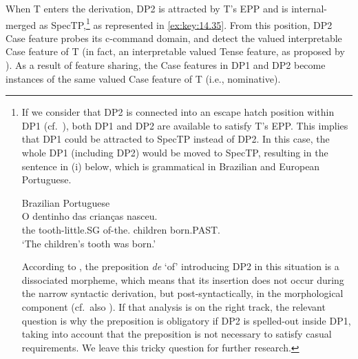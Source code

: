 \documentclass[output=paper]{langsci/langscibook}
\begin{document}
When T enters the derivation, DP2 is attracted by T’s \gls{EPP} and is
internal-merged as SpecTP,\footnote{If we consider that DP2 is connected into
    an escape hatch position within DP1 (cf.\ \citealt{Avelar2006}), both DP1
    and DP2 are available to satisfy T’s \gls{EPP}. This implies that DP1 could
    be attracted to SpecTP instead of DP2. In this case, the whole DP1
    (including DP2) would be moved to SpecTP, resulting in the sentence in (i)
    below, which is grammatical in Brazilian and European Portuguese.

    \begin{exe}
        Brazilian Portuguese\\
        \gll    O dentinho das   crianças nasceu.\\
                the tooth-little.SG of-the.\Pl{} children born.PAST.\Tsg{}\\
        \glt    ‘The children’s tooth was born.’
    \end{exe}

According to \citet{Avelar2006}, the preposition \emph{de} ‘of’ introducing DP2
in this situation is a dissociated morpheme, which means that its insertion
does not occur during the narrow syntactic derivation, but post-syntactically,
in the morphological component (cf.\ also \citealt{Raposo2002}). If that
analysis is on the right track, the relevant question is why the preposition is
obligatory if DP2 is spelled-out inside DP1, taking into account that the
preposition is not necessary to satisfy casual requirements.  We leave this
tricky question for further research.} as represented in \eqref{ex:key:14.35}. From
this position, DP2 Case feature probes its c-command domain, and detect the
valued interpretable Case feature of T (in fact, an interpretable valued Tense
feature, as proposed by \citealt{PesTor2004}). As a result of feature
sharing, the Case features in DP1 and DP2 become instances of the same valued
Case feature of T (i.e., nominative).

\ea%
    \label{ex:key:14.35}
    \z
\end{document}
